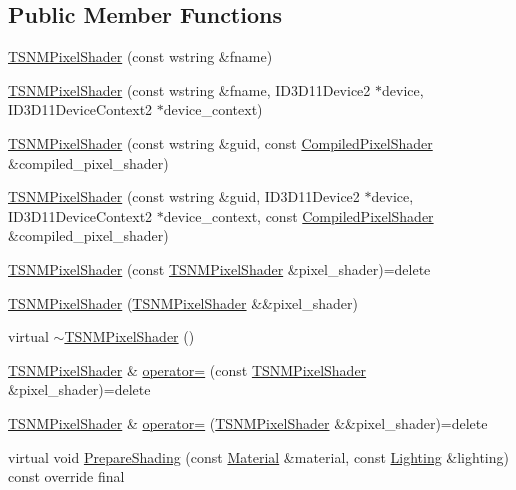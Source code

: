 \subsection*{Public Member Functions}
\begin{DoxyCompactItemize}
\item 
\hyperlink{classmage_1_1_t_s_n_m_pixel_shader_a0081c5ca9470521f2f7d01dfcfe1996d}{T\+S\+N\+M\+Pixel\+Shader} (const wstring \&fname)
\item 
\hyperlink{classmage_1_1_t_s_n_m_pixel_shader_ace6ab7447386a00f2280ddd742dfadef}{T\+S\+N\+M\+Pixel\+Shader} (const wstring \&fname, I\+D3\+D11\+Device2 $\ast$device, I\+D3\+D11\+Device\+Context2 $\ast$device\+\_\+context)
\item 
\hyperlink{classmage_1_1_t_s_n_m_pixel_shader_a7740332d83ccbaf1b99a9c861ff3b137}{T\+S\+N\+M\+Pixel\+Shader} (const wstring \&guid, const \hyperlink{structmage_1_1_compiled_pixel_shader}{Compiled\+Pixel\+Shader} \&compiled\+\_\+pixel\+\_\+shader)
\item 
\hyperlink{classmage_1_1_t_s_n_m_pixel_shader_a1355e9a1e476dadbb3e9a7c1bf260d84}{T\+S\+N\+M\+Pixel\+Shader} (const wstring \&guid, I\+D3\+D11\+Device2 $\ast$device, I\+D3\+D11\+Device\+Context2 $\ast$device\+\_\+context, const \hyperlink{structmage_1_1_compiled_pixel_shader}{Compiled\+Pixel\+Shader} \&compiled\+\_\+pixel\+\_\+shader)
\item 
\hyperlink{classmage_1_1_t_s_n_m_pixel_shader_af01a39116e8759ecd28aaba009c8b8ad}{T\+S\+N\+M\+Pixel\+Shader} (const \hyperlink{classmage_1_1_t_s_n_m_pixel_shader}{T\+S\+N\+M\+Pixel\+Shader} \&pixel\+\_\+shader)=delete
\item 
\hyperlink{classmage_1_1_t_s_n_m_pixel_shader_a4889850bd4ff6c3a3d22c9637752ce37}{T\+S\+N\+M\+Pixel\+Shader} (\hyperlink{classmage_1_1_t_s_n_m_pixel_shader}{T\+S\+N\+M\+Pixel\+Shader} \&\&pixel\+\_\+shader)
\item 
virtual \hyperlink{classmage_1_1_t_s_n_m_pixel_shader_ae7c20ffb872faffb28714b39916e4250}{$\sim$\+T\+S\+N\+M\+Pixel\+Shader} ()
\item 
\hyperlink{classmage_1_1_t_s_n_m_pixel_shader}{T\+S\+N\+M\+Pixel\+Shader} \& \hyperlink{classmage_1_1_t_s_n_m_pixel_shader_a8c9bc92d544b088e9530f8f47df2b4a6}{operator=} (const \hyperlink{classmage_1_1_t_s_n_m_pixel_shader}{T\+S\+N\+M\+Pixel\+Shader} \&pixel\+\_\+shader)=delete
\item 
\hyperlink{classmage_1_1_t_s_n_m_pixel_shader}{T\+S\+N\+M\+Pixel\+Shader} \& \hyperlink{classmage_1_1_t_s_n_m_pixel_shader_a0d714c73017f9bb9b273b2d2a276ab5f}{operator=} (\hyperlink{classmage_1_1_t_s_n_m_pixel_shader}{T\+S\+N\+M\+Pixel\+Shader} \&\&pixel\+\_\+shader)=delete
\item 
virtual void \hyperlink{classmage_1_1_t_s_n_m_pixel_shader_abe01a4e6007a0a1ca98ed8fe48523138}{Prepare\+Shading} (const \hyperlink{structmage_1_1_material}{Material} \&material, const \hyperlink{structmage_1_1_lighting}{Lighting} \&lighting) const override final
\end{DoxyCompactItemize}
